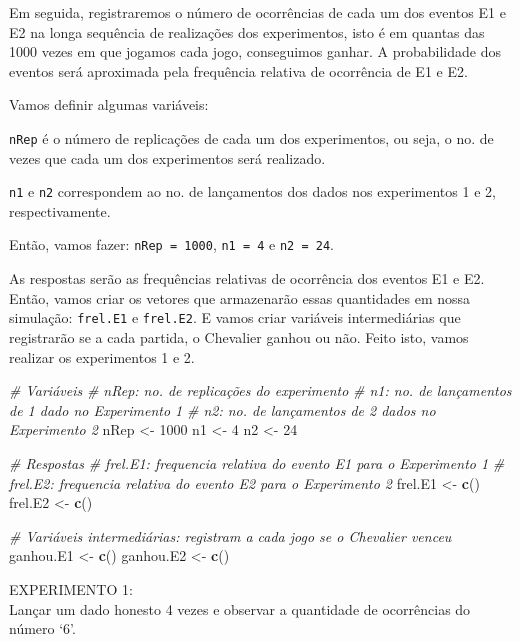 \documentclass[
]{book}
\newenvironment{Shaded}{\begin{snugshade}}{\end{snugshade}}
\newcommand{\CommentTok}[1]{\textcolor[rgb]{0.56,0.35,0.01}{\textit{#1}}}
\newcommand{\DecValTok}[1]{\textcolor[rgb]{0.00,0.00,0.81}{#1}}
\newcommand{\KeywordTok}[1]{\textcolor[rgb]{0.13,0.29,0.53}{\textbf{#1}}}
\newcommand{\NormalTok}[1]{#1}
\newcommand{\StringTok}[1]{\textcolor[rgb]{0.31,0.60,0.02}{#1}}
\theoremstyle{definition}
\theoremstyle{definition}
\theoremstyle{definition}
\theoremstyle{remark}
\begin{document}
Em seguida, registraremos o número de ocorrências de cada um dos eventos E1 e E2 na longa sequência de realizações dos experimentos, isto é em quantas das 1000 vezes em que jogamos cada jogo, conseguimos ganhar. A probabilidade dos eventos será aproximada pela frequência relativa de ocorrência de E1 e E2.

Vamos definir algumas variáveis:

\texttt{nRep} é o número de replicações de cada um dos experimentos, ou seja, o no. de vezes que cada um dos experimentos será realizado.

\texttt{n1} e \texttt{n2} correspondem ao no. de lançamentos dos dados nos experimentos 1 e 2, respectivamente.

Então, vamos fazer: \texttt{nRep\ =\ 1000}, \texttt{n1\ =\ 4} e \texttt{n2\ =\ 24}.

As respostas serão as frequências relativas de ocorrência dos eventos E1 e E2. Então, vamos criar os vetores que armazenarão essas quantidades em nossa simulação: \texttt{frel.E1} e \texttt{frel.E2}. E vamos criar variáveis intermediárias que registrarão se a cada partida, o Chevalier ganhou ou não. Feito isto, vamos realizar os experimentos 1 e 2.

\begin{Shaded}
\begin{Highlighting}[]
\CommentTok{# Variáveis}
\CommentTok{# nRep: no. de replicações do experimento}
\CommentTok{# n1: no. de lançamentos de 1 dado no Experimento 1}
\CommentTok{# n2: no. de lançamentos de 2 dados no Experimento 2}
\NormalTok{nRep <-}\StringTok{ }\DecValTok{1000}
\NormalTok{n1 <-}\StringTok{ }\DecValTok{4}
\NormalTok{n2 <-}\StringTok{ }\DecValTok{24}

\CommentTok{# Respostas}
\CommentTok{# frel.E1: frequencia relativa do evento E1 para o Experimento 1}
\CommentTok{# frel.E2: frequencia relativa do evento E2 para o Experimento 2}
\NormalTok{frel.E1 <-}\StringTok{ }\KeywordTok{c}\NormalTok{()}
\NormalTok{frel.E2 <-}\StringTok{ }\KeywordTok{c}\NormalTok{()}

\CommentTok{# Variáveis intermediárias: registram a cada jogo se o Chevalier venceu}
\NormalTok{ganhou.E1 <-}\StringTok{ }\KeywordTok{c}\NormalTok{()}
\NormalTok{ganhou.E2 <-}\StringTok{ }\KeywordTok{c}\NormalTok{()}
\end{Highlighting}
\end{Shaded}

EXPERIMENTO 1:\\
Lançar um dado honesto 4 vezes e observar a quantidade de ocorrências do número `6'.
\end{document}
